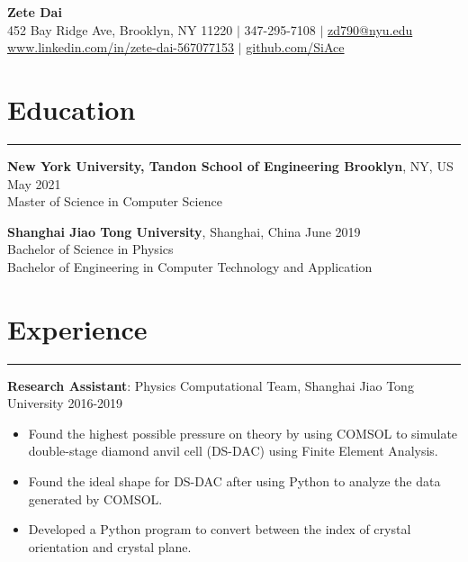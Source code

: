 \documentclass{article}
\begin{document}

\begin{center}
  {\Large\textbf{Zete Dai}} \\
  452 Bay Ridge Ave, Brooklyn, NY 11220 $|$
  347-295-7108 $|$
  \href{mailto:zd790@nyu.edu}{zd790@nyu.edu} \\
  \href{https://www.linkedin.com/in/zete-dai-567077153/}{www.linkedin.com/in/zete-dai-567077153} $|$
  \href{https://github.com/SiAce}{github.com/SiAce}
  
\end{center}

\section{Education}
\hrule
\vspace{1em}

\textbf{New York University, Tandon School of Engineering Brooklyn}, NY, US \hfill
May 2021 \\
Master of Science in Computer Science

\vspace{1em}

\textbf{Shanghai Jiao Tong University}, Shanghai, China \hfill
June 2019 \\
Bachelor of Science in Physics \\
Bachelor of Engineering in Computer Technology and Application

\section{Experience}
\hrule
\vspace{1em}

\textbf{Research Assistant}: Physics Computational Team, Shanghai Jiao Tong University \hfill
2016-2019

\begin{itemize}[nosep]
	\item Found the highest possible pressure on theory by using COMSOL to simulate double-stage diamond anvil cell
	(DS-DAC) using Finite Element Analysis.
	\item Found the ideal shape for DS-DAC after using Python to analyze the data generated by COMSOL.
	\item Developed a Python program to convert between the index of crystal orientation and crystal plane.
\end{itemize}

\vspace{1em}
\end{document}
